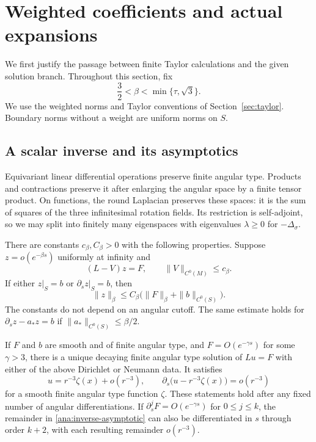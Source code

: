 \section{Weighted coefficients and actual expansions}
\label{ana:section}

We first justify the passage between finite Taylor calculations and the
given solution branch.  Throughout this section, fix
\begin{equation}
  \frac32<\beta<\min\{\tau,\sqrt3\}.
  \label{ana:beta}
\end{equation}
We use the weighted norms and Taylor conventions of
Section~\ref{sec:taylor}. Boundary norms without a weight are uniform
norms on $S$.

\subsection{A scalar inverse and its asymptotics}

Equivariant linear differential operations preserve finite angular type.  Products and contractions preserve
it after enlarging the angular space by a finite tensor product.  On
functions, the round Laplacian preserves these spaces: it is the sum of
squares of the three infinitesimal rotation fields.  Its restriction is
self-adjoint, so we may split into finitely many eigenspaces with
eigenvalues $\lambda\geq0$ for $-\Delta_\sigma$.

\begin{lemma}
\label{lem:inverse}
There are constants $c_\beta,C_\beta>0$ with the following properties.
Suppose $z=o(e^{-\beta s})$ uniformly at infinity and
\[
  (L-V)z=F,\qquad \|V\|_{C^0(M)}\leq c_\beta.
\]
If either $z|_S=b$ or $\partial_s z|_S=b$, then
\begin{equation}
  \|z\|_\beta\leq C_\beta
       \bigl(\|F\|_\beta+\|b\|_{C^0(S)}\bigr).
  \label{ana:comparison}
\end{equation}
The constants do not depend on an angular cutoff.  The same estimate
holds for $\partial_s z-a_*z=b$ if
$\|a_*\|_{C^0(S)}\leq\beta/2$.

If $F$ and $b$ are smooth and of finite angular type, and
$F=O(e^{-\gamma s})$ for some $\gamma>3$, there is a unique decaying
finite angular type solution of $Lu=F$ with either of the above
Dirichlet or Neumann data.  It satisfies
\begin{equation}
  u=r^{-3}\zeta(x)+o(r^{-3}),\qquad
  \partial_s\bigl(u-r^{-3}\zeta(x)\bigr)=o(r^{-3})
  \label{ana:inverse-asymptotic}
\end{equation}
for a smooth finite angular type function $\zeta$.  These statements
hold after any fixed number of angular differentiations.  If
$\partial_s^jF=O(e^{-\gamma s})$ for $0\leq j\leq k$, the remainder
in \eqref{ana:inverse-asymptotic} can also be differentiated in $s$
through order $k+2$, with each resulting remainder $o(r^{-3})$.
\end{lemma}

